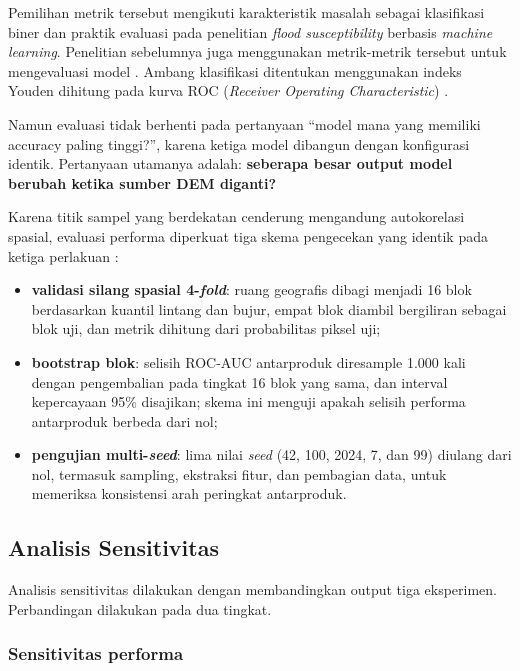 \documentclass[12pt]{article}
\begin{document}
Pemilihan metrik tersebut mengikuti karakteristik masalah sebagai
klasifikasi biner dan praktik evaluasi pada penelitian \textit{flood
susceptibility} berbasis \textit{machine learning}. Penelitian sebelumnya
juga menggunakan metrik-metrik tersebut untuk mengevaluasi model
\cite{hakim2026}. Ambang klasifikasi ditentukan menggunakan indeks Youden
dihitung pada kurva ROC (\textit{Receiver Operating Characteristic})
\cite{youden1950}.

Namun evaluasi tidak berhenti pada pertanyaan ``model mana yang memiliki
accuracy paling tinggi?'', karena ketiga model dibangun dengan konfigurasi
identik. Pertanyaan
utamanya adalah: \textbf{seberapa besar output model berubah ketika sumber
DEM diganti?}

Karena titik sampel yang berdekatan cenderung mengandung autokorelasi
spasial, evaluasi performa diperkuat tiga skema pengecekan yang identik pada ketiga
perlakuan \cite{roberts2017,ploton2020}:

\begin{itemize}
\item \textbf{validasi silang spasial 4-\textit{fold}}: ruang geografis
dibagi menjadi 16 blok berdasarkan kuantil lintang dan bujur, empat blok
diambil bergiliran sebagai blok uji, dan metrik dihitung dari probabilitas
piksel uji;
\item \textbf{bootstrap blok}: selisih ROC-AUC antarproduk diresample
1.000 kali dengan pengembalian pada tingkat 16 blok yang sama, dan
interval kepercayaan 95\% disajikan; skema ini menguji apakah selisih
performa antarproduk berbeda dari nol;
\item \textbf{pengujian multi-\textit{seed}}: lima nilai \textit{seed}
(42, 100, 2024, 7, dan 99) diulang dari nol, termasuk sampling, ekstraksi
fitur, dan pembagian data, untuk memeriksa konsistensi arah peringkat
antarproduk.
\end{itemize}

\subsection{Analisis Sensitivitas}

Analisis sensitivitas dilakukan dengan membandingkan output tiga eksperimen.
Perbandingan dilakukan pada dua tingkat.

\subsubsection{Sensitivitas performa}
\end{document}

